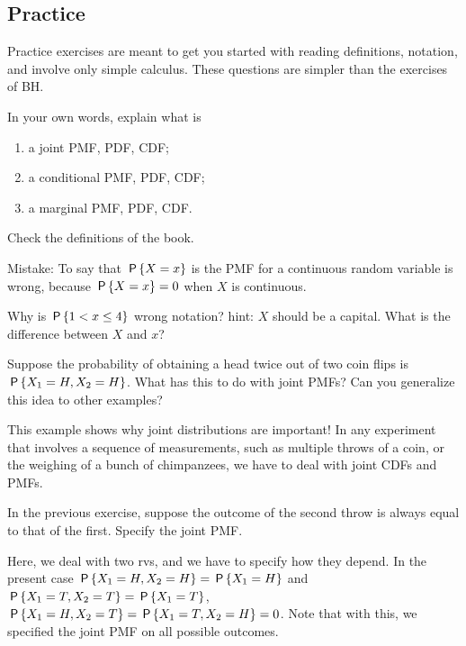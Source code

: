 \subsection{Practice}
\label{sec:simple-exercises}

Practice exercises are meant to get you started with reading definitions, notation, and involve only simple calculus.
These questions are simpler than the exercises of BH.



\begin{exercise}
In your own words, explain what is
\begin{enumerate}
\item a joint PMF, PDF, CDF;
\item a conditional PMF, PDF, CDF;
\item a marginal PMF, PDF, CDF.
\end{enumerate}
\begin{solution}
Check the definitions of the book.

Mistake: To say that $\P{X=x}$ is the PMF for a continuous random variable is wrong, because $\P{X=x}=0$ when $X$ is continuous.

Why is $\P{1 < x \leq 4}$ wrong notation?
hint: $X$ should be a capital.
What is the difference between $X$ and $x$?

\end{solution}
\end{exercise}



\begin{exercise}
Suppose the probability of obtaining a head twice out of two coin flips is $\P{X_1=H, X_2=H}$.
What has this to do with joint PMFs? Can you generalize this idea to other examples?
\begin{solution}
This example shows why joint distributions are important!
In any experiment that involves a sequence of measurements, such as multiple throws of a coin, or the weighing of a bunch of chimpanzees, we have to deal with joint CDFs and PMFs.
\end{solution}
\end{exercise}


\begin{exercise}
In the previous exercise, suppose the outcome of the second throw is always equal to that of the first. Specify the joint PMF.
\begin{solution}
Here, we deal with two rvs, and we have to specify how they depend. In the present case $\P{X_1= H, X_2=H} = \P{X_1=H}$ and $\P{X_1= T, X_2=T} = \P{X_1=T}$, $\P{X_1= H, X_2=T} = \P{X_1= T, X_2=H} = 0$. Note that with this, we specified the joint PMF on all possible outcomes.
\end{solution}
\end{exercise}


